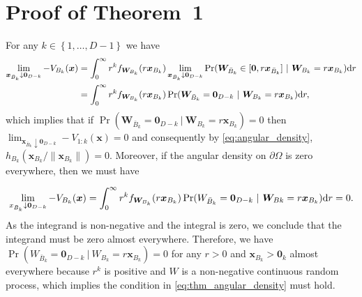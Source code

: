 \documentclass[12pt]{article}
\begin{document}
\section{Proof of Theorem~1}
For any $k \in \left\{1, \ldots, D-1 \right\}$ we have
\begin{align*}
\lim_{\bm x_{\bar{B}_k} \downarrow \bm 0_{D-k} } -V_{B_k}(\bm x) &= \int_0^\infty r^k f_{\bm W_{B_k}}(r \bm x_{B_k}) \lim_{\bm x_{\bar{B}_k} \downarrow \bm 0_{D-k} }\Pr(\bm W_{\bar{B}_k} \in [\bm 0,r \bm x_{\bar{B}_k} ]\ |\ \bm W_{B_k} = r \bm x_{B_k} )\text dr\\
&= \int_0^\infty r^k f_{\bm W_{B_k}}(r \bm x_{B_k})\Pr(\bm W_{\bar{B}_k}=\bm 0_{D-k}\ |\ \bm W_{B_k}=r \bm x_{B_k} )\text dr,
\end{align*}
which implies that if $\Pr(\bm W_{\bar{B}_k}=\bm 0_{D-k}\ |\ \bm W_{B_k}=r \bm x_{B_k} )=0$ then $\lim_{\bm x_{\bar{B}_k} \downarrow \bm 0_{D-k} } -V_{1:k}(\bm x) = 0$ and consequently by \eqref{eq:angular_density}, $h_{B_k}\left(\bm x_{B_k} / \|\bm x_{B_k}\| \right)=0$.
%
Moreover, if the angular density on $\partial\Omega$ is zero everywhere, then we must have 

$$\lim_{x_{\bar{B}_k}\downarrow \bm 0_{D-k} } -V_{B_k}(\bm x) = \int_0^\infty r^k f_{\bm W_{B_k}}(r \bm x_{B_k})\Pr(W_{\bar{B}_k} = \bm 0_{D-k}\ |\ \bm W_{Bk}=r \bm x_{B_k} )\text dr = 0.$$
As the integrand is non-negative and the integral is zero, we conclude that the integrand must be zero almost everywhere. Therefore, we have $\Pr(W_{\bar{B}_k} = \bm 0_{D-k}\ |\ W_{B_k}=r\bm x_{B_k} )=0$ for any $r>0$ and $\bm x_{B_k} > \bm 0_k$ almost everywhere because $r^k$ is positive and $W$ is a non-negative continuous random process, which implies the condition in \eqref{eq:thm_angular_density} must hold.
\end{document}

